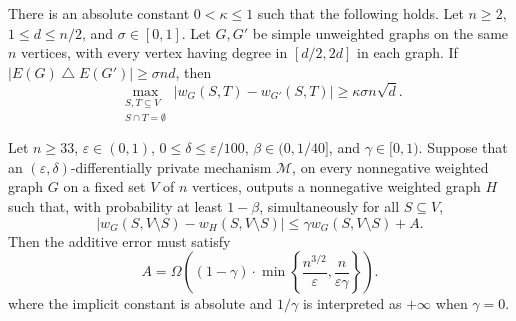 \begin{lemma}
\label{lem:ekkl-discrepancy}
There is an absolute constant $0<\kappa\leq1$ such that the following holds.
Let $n\geq2$, $1\leq d\leq n/2$, and $\sigma\in[0,1]$.
Let $G,G'$ be simple unweighted graphs on the same $n$ vertices, with every
vertex having degree in $[d/2,2d]$ in each graph. If
$|E(G)\mathbin{\triangle}E(G')|\geq\sigma nd$, then
\[
 \max_{\substack{S,T\subseteq V\\S\cap T=\emptyset}}
       |w_G(S,T)-w_{G'}(S,T)|\geq\kappa\sigma n\sqrt d.
\]
\end{lemma}

\begin{theorem}
\label{thm:lower_bound}
Let $n\geq33$, $\varepsilon\in(0,1)$, $0\leq\delta\leq\varepsilon/100$,
$\beta\in (0,1/40]$, and $\gamma \in [0, 1)$.
Suppose that an $(\varepsilon,\delta)$-differentially private mechanism
$\mathcal M$, on every nonnegative weighted graph $G$ on a fixed set $V$
of $n$ vertices, outputs a nonnegative weighted graph $H$ such that,
with probability at least $1-\beta$, simultaneously for all $S\subseteq V$,
\[
 \left|w_G(S, V\setminus S) - w_H(S, V\setminus S)\right| \leq \gamma w_G(S, V\setminus S) + A.
\]
Then the additive error must satisfy
\[
 A=\Omega\left(
   (1-\gamma)\cdot\min\left\{\frac{n^{3/2}}{\varepsilon},
                    \frac{n}{\varepsilon\gamma}\right\}
 \right).
\]
where the implicit constant is absolute and $1/\gamma$ is interpreted as
$+\infty$ when $\gamma=0$.
\end{theorem}
